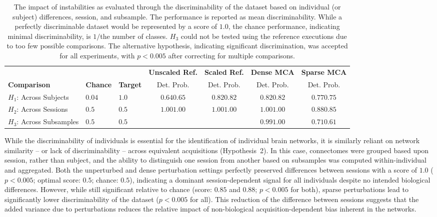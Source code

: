 \documentclass[10pt,letterpaper]{article}
\begin{document}
\begin{table}[ht]\centering
\caption{The impact of instabilities as evaluated through the discriminability of the
dataset based on individual (or subject) differences, session, and subsample. The
performance is reported as mean discriminability. While a perfectly discriminable
dataset would be represented by a score of $1.0$, the chance performance, indicating
minimal discriminability, is $1 /$the number of classes. $H_3$ could not be tested
using the reference executions due to too few possible comparisons. The alternative
hypothesis, indicating significant discrimination, was accepted for all experiments,
with $p < 0.005$ after correcting for multiple comparisons.}
\vspace{5pt}
\begin{tabular}{lllcccc}
 \cellcolor{color1!10}          & \cellcolor{color1!10}   &  \cellcolor{color1!10} & \cellcolor{color1!10} \textbf{Unscaled Ref.} & \cellcolor{color1!10} \textbf{Scaled Ref.} & \cellcolor{color1!10}\textbf{Dense MCA} & \cellcolor{color1!10} \textbf{Sparse MCA} \\
\cellcolor{color1!10}\textbf{Comparison} & \cellcolor{color1!10}\textbf{Chance} & \cellcolor{color1!10}\textbf{Target} & \cellcolor{color1!10}Det. \quad Prob. & \cellcolor{color1!10}Det. \quad Prob. & \cellcolor{color1!10} Det. \quad Prob. & \cellcolor{color1!10}Det. \quad Prob. \\
\hline
$H_{1}$: Across Subjects  & $0.04$& $1.0$& $0.64$\quad$0.65$ &$0.82$\quad$0.82$& $0.82$\quad$0.82$& $0.77$\quad$0.75$\\
$H_{2}$: Across Sessions  & $0.5$ & $0.5$& $1.00$\quad$1.00$ &$1.00$\quad$1.00$& $1.00$\quad$1.00$& $0.88$\quad$0.85$\\
$H_{3}$: Across Subsamples& $0.5$ & $0.5$&                   &                 & $0.99$\quad$1.00$& $0.71$\quad$0.61$\\
\end{tabular}
\label{tab:discrim}
\end{table}

While the discriminability of individuals is essential for the identification of
individual brain networks, it is similarly reliant on network similarity – or lack of
discriminability – across equivalent acquisitions (Hypothesis~2). In this case,
connectomes were grouped based upon session, rather than subject, and the ability to
distinguish one session from another based on subsamples was computed within-individual
and aggregated. Both the unperturbed and dense perturbation settings perfectly
preserved differences between sessions with a score of $1.0$ ($p < 0.005$; optimal
score: $0.5$; chance: $0.5$), indicating a dominant session-dependent signal for all
individuals despite no intended biological differences. However, while still
significant relative to chance (score: $0.85$ and $0.88$; $p < 0.005$ for both), sparse
perturbations lead to significantly lower discriminability of the dataset
($p < 0.005$ for all). This reduction of the difference between sessions suggests that 
the added variance due to perturbations reduces the relative impact of non-biological
acquisition-dependent bias inherent in the networks.
\end{document}

